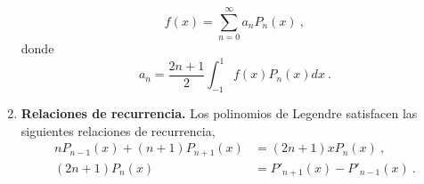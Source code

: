 \begin{propiedad}
\begin{enumerate}
        \begin{equation}
            f(x) = \sum_{n=0}^\infty a_n P_n(x) \ ,
        \end{equation}
        donde 
        \begin{equation}
            a_n = \frac{2n+1}{2} \int_{-1}^1 f(x) P_n(x) dx \ .
        \end{equation}
         
        \item \textbf{Relaciones de recurrencia.} Los polinomios de Legendre satisfacen las siguientes relaciones de recurrencia,
        \begin{align}
            n P_{n-1}(x) + (n+1) P_{n+1}(x) & = (2n+1) x P_n(x) \ , \\
            (2n+1) P_n(x) & = P'_{n+1}(x) - P'_{n-1}(x) \ .
        \end{align}    
    \end{enumerate}
\end{propiedad}

